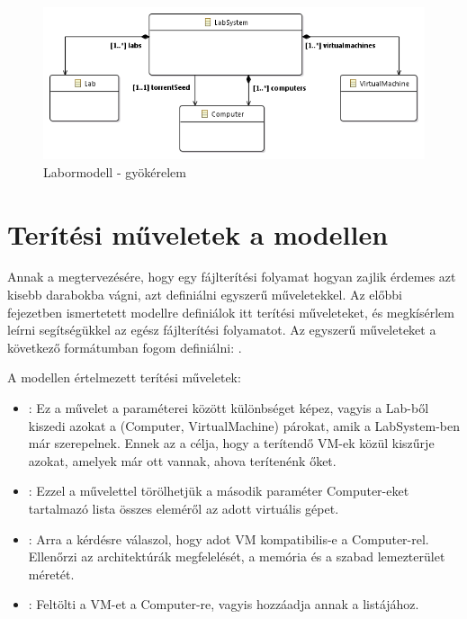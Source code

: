 \begin{figure}[h!]
	\centering
	\includegraphics[width=130mm, keepaspectratio]{figures/design_modelroot.png}
	\caption{Labormodell - gyökérelem}
	\label{fig:designmodelroot}
\end{figure}

\section{Terítési műveletek a modellen}
\label{distrops}

Annak a megtervezésére, hogy egy fájlterítési folyamat hogyan zajlik érdemes azt kisebb darabokba vágni, azt definiálni egyszerű műveletekkel.
Az előbbi fejezetben ismertetett modellre definiálok itt terítési műveleteket, és megkísérlem leírni segítségükkel az egész fájlterítési folyamatot.
Az egyszerű műveleteket a következő formátumban fogom definiálni: .

A modellen értelmezett terítési műveletek:

\begin{itemize}
  \item {}: Ez a művelet a paraméterei között különbséget képez, vagyis a Lab-ből kiszedi azokat a (Computer, VirtualMachine) párokat, amik a LabSystem-ben már szerepelnek. Ennek az a célja, hogy a terítendő VM-ek közül kiszűrje azokat, amelyek már ott vannak, ahova terítenénk őket.
  \item {}: Ezzel a művelettel törölhetjük a második paraméter Computer-eket tartalmazó lista összes eleméről az adott virtuális gépet.
  \item {}: Arra a kérdésre válaszol, hogy adot VM kompatibilis-e a Computer-rel. Ellenőrzi az architektúrák megfelelését, a memória és a szabad lemezterület méretét.
  \item {}: Feltölti a VM-et a Computer-re, vagyis hozzáadja annak a  listájához.
\end{itemize}

